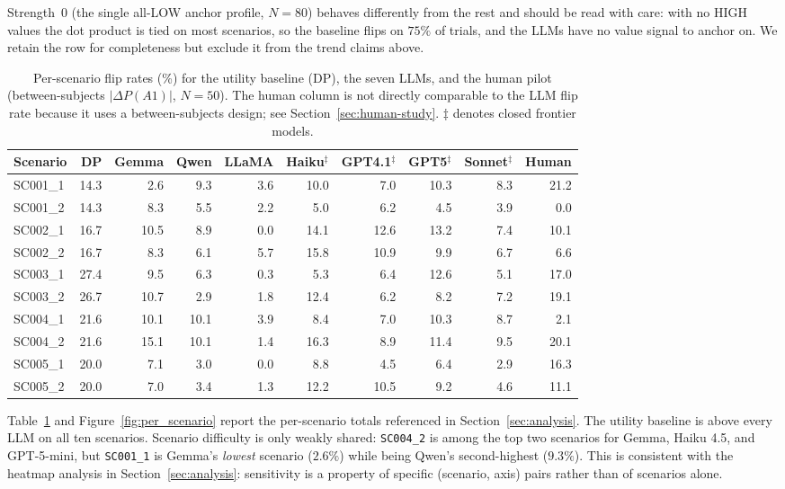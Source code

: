 \documentclass[11pt]{article}
\begin{document}
Strength~0 (the single all-LOW anchor profile, $N=80$) behaves differently from the rest and should be read with care: with no HIGH values the dot product is tied on most scenarios, so the baseline flips on $75\%$ of trials, and the LLMs have no value signal to anchor on. We retain the row for completeness but exclude it from the trend claims above.

\begin{table}[t]
\centering
\footnotesize
\setlength{\tabcolsep}{4pt}
\begin{tabular}{@{}lrrrrrrrrr@{}}
\toprule
\textbf{Scenario} & \textbf{DP} & \textbf{Gemma} & \textbf{Qwen} & \textbf{LLaMA} & \textbf{Haiku}$^\ddagger$ & \textbf{GPT4.1}$^\ddagger$ & \textbf{GPT5}$^\ddagger$ & \textbf{Sonnet}$^\ddagger$ & \textbf{Human} \\
\midrule
SC001\_1 & 14.3 & 2.6 & 9.3 & 3.6 & 10.0 & 7.0 & 10.3 & 8.3 & 21.2 \\
SC001\_2 & 14.3 & 8.3 & 5.5 & 2.2 & 5.0 & 6.2 & 4.5 & 3.9 & 0.0 \\
SC002\_1 & 16.7 & 10.5 & 8.9 & 0.0 & 14.1 & 12.6 & 13.2 & 7.4 & 10.1 \\
SC002\_2 & 16.7 & 8.3 & 6.1 & 5.7 & 15.8 & 10.9 & 9.9 & 6.7 & 6.6 \\
SC003\_1 & 27.4 & 9.5 & 6.3 & 0.3 & 5.3 & 6.4 & 12.6 & 5.1 & 17.0 \\
SC003\_2 & 26.7 & 10.7 & 2.9 & 1.8 & 12.4 & 6.2 & 8.2 & 7.2 & 19.1 \\
SC004\_1 & 21.6 & 10.1 & 10.1 & 3.9 & 8.4 & 7.0 & 10.3 & 8.7 & 2.1 \\
SC004\_2 & 21.6 & 15.1 & 10.1 & 1.4 & 16.3 & 8.9 & 11.4 & 9.5 & 20.1 \\
SC005\_1 & 20.0 & 7.1 & 3.0 & 0.0 & 8.8 & 4.5 & 6.4 & 2.9 & 16.3 \\
SC005\_2 & 20.0 & 7.0 & 3.4 & 1.3 & 12.2 & 10.5 & 9.2 & 4.6 & 11.1 \\
\bottomrule
\end{tabular}
\caption{Per-scenario flip rates (\%) for the utility baseline (DP), the seven LLMs, and the human pilot (between-subjects $|\Delta P(A1)|$, $N=50$). The human column is not directly comparable to the LLM flip rate because it uses a between-subjects design; see Section~\ref{sec:human-study}. $\ddagger$ denotes closed frontier models.}
\label{tab:per_scenario}
\end{table}

Table~\ref{tab:per_scenario} and Figure~\ref{fig:per_scenario} report the per-scenario totals referenced in Section~\ref{sec:analysis}. The utility baseline is above every LLM on all ten scenarios. Scenario difficulty is only weakly shared: \texttt{SC004\_2} is among the top two scenarios for Gemma, Haiku 4.5, and GPT-5-mini, but \texttt{SC001\_1} is Gemma's \emph{lowest} scenario ($2.6\%$) while being Qwen's second-highest ($9.3\%$). This is consistent with the heatmap analysis in Section~\ref{sec:analysis}: sensitivity is a property of specific (scenario, axis) pairs rather than of scenarios alone.
\end{document}
